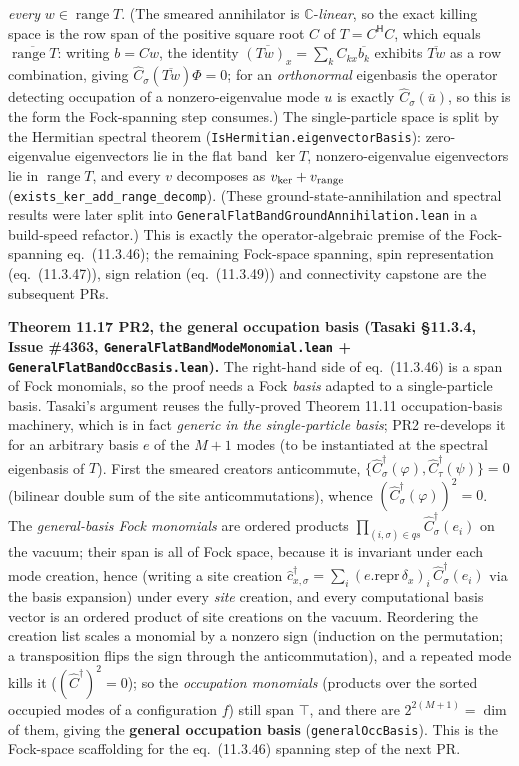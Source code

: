 \documentclass[a4paper,11pt]{article}
\begin{document}
\emph{every} $w\in\operatorname{range}T$.  (The smeared annihilator is $\mathbb C$-\emph{linear},
so the exact killing space is the row span of the positive square root $C$ of $T=C^{\mathsf H}C$,
which equals $\overline{\operatorname{range}T}$: writing $b=Cw$, the identity
$\overline{(Tw)_x}=\sum_k C_{kx}\overline{b_k}$ exhibits $\overline{Tw}$ as a row combination, giving
$\hat C_\sigma(\overline{Tw})\Phi=0$; for an \emph{orthonormal} eigenbasis the operator detecting
occupation of a nonzero-eigenvalue mode $u$ is exactly $\hat C_\sigma(\bar u)$, so this is the form
the Fock-spanning step consumes.)  The single-particle space is split by
the Hermitian spectral theorem (\texttt{IsHermitian.eigenvectorBasis}): zero-eigenvalue
eigenvectors lie in the flat band $\ker T$, nonzero-eigenvalue eigenvectors lie in
$\operatorname{range}T$, and every $v$ decomposes as $v_{\ker}+v_{\rm range}$
(\texttt{exists\_ker\_add\_range\_decomp}).  (These ground-state-annihilation and spectral results
were later split into \texttt{GeneralFlatBandGroundAnnihilation.lean} in a build-speed refactor.)
This is exactly the operator-algebraic premise of the
Fock-spanning eq.~(11.3.46); the remaining Fock-space spanning, spin representation
(eq.~(11.3.47)), sign relation (eq.~(11.3.49)) and connectivity capstone are the subsequent PRs.

\medskip\noindent\textbf{Theorem 11.17 PR2, the general occupation basis (Tasaki §11.3.4,
Issue \#4363, \texttt{GeneralFlatBandModeMonomial.lean} + \texttt{GeneralFlatBandOccBasis.lean}).}
The right-hand side of eq.~(11.3.46) is a span of Fock monomials, so the proof needs a Fock
\emph{basis} adapted to a single-particle basis.  Tasaki's argument reuses the fully-proved
Theorem 11.11 occupation-basis machinery, which is in fact \emph{generic in the single-particle
basis}; PR2 re-develops it for an arbitrary basis $e$ of the $M{+}1$ modes (to be instantiated at the
spectral eigenbasis of $T$).  First the smeared creators anticommute,
$\{\hat C^\dagger_\sigma(\varphi),\hat C^\dagger_\tau(\psi)\}=0$ (bilinear double sum of the site
anticommutations), whence $(\hat C^\dagger_\sigma(\varphi))^2=0$.  The \emph{general-basis Fock
monomials} are ordered products $\prod_{(i,\sigma)\in qs}\hat C^\dagger_\sigma(e_i)$ on the vacuum;
their span is all of Fock space, because it is invariant under each mode creation, hence (writing a
site creation $\hat c^\dagger_{x,\sigma}=\sum_i (e.\mathrm{repr}\,\delta_x)_i\,\hat
C^\dagger_\sigma(e_i)$ via the basis expansion) under every \emph{site} creation, and every
computational basis vector is an ordered product of site creations on the vacuum.  Reordering the
creation list scales a monomial by a nonzero sign (induction on the permutation; a transposition
flips the sign through the anticommutation), and a repeated mode kills it ($(\hat C^\dagger)^2=0$);
so the \emph{occupation monomials} (products over the sorted occupied modes of a configuration
$f$) still span $\top$, and there are $2^{2(M+1)}=\dim$ of them, giving the \textbf{general
occupation basis} (\texttt{generalOccBasis}).  This is the Fock-space scaffolding for the
eq.~(11.3.46) spanning step of the next PR.
\end{document}
